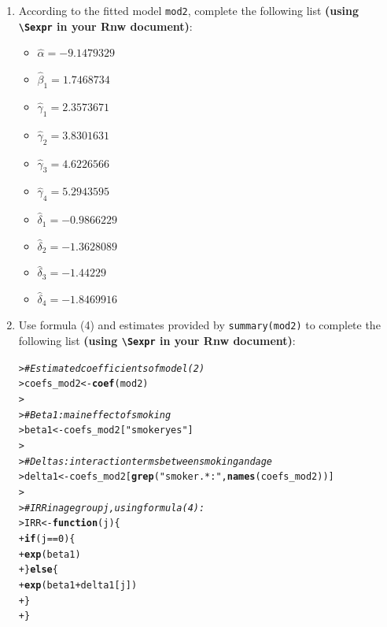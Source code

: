 \documentclass[a4paper,10pt]{article}\usepackage[]{graphicx}\usepackage[]{xcolor}
\makeatletter
\newcommand{\hlnum}[1]{\textcolor[rgb]{0.686,0.059,0.569}{#1}}%
\newcommand{\hlsng}[1]{\textcolor[rgb]{0.192,0.494,0.8}{#1}}%
\newcommand{\hlcom}[1]{\textcolor[rgb]{0.678,0.584,0.686}{\textit{#1}}}%
\newcommand{\hlopt}[1]{\textcolor[rgb]{0,0,0}{#1}}%
\newcommand{\hldef}[1]{\textcolor[rgb]{0.345,0.345,0.345}{#1}}%
\newcommand{\hlkwa}[1]{\textcolor[rgb]{0.161,0.373,0.58}{\textbf{#1}}}%
\newcommand{\hlkwb}[1]{\textcolor[rgb]{0.69,0.353,0.396}{#1}}%
\newcommand{\hlkwc}[1]{\textcolor[rgb]{0.333,0.667,0.333}{#1}}%
\newcommand{\hlkwd}[1]{\textcolor[rgb]{0.737,0.353,0.396}{\textbf{#1}}}%
\newenvironment{kframe}{%
 \def\at@end@of@kframe{}%
 \ifinner\ifhmode%
  \def\at@end@of@kframe{\end{minipage}}%
  \begin{minipage}{\columnwidth}%
 \fi\fi%
 \def\FrameCommand##1{\hskip\@totalleftmargin \hskip-\fboxsep
 \colorbox{shadecolor}{##1}\hskip-\fboxsep
     \hskip-\linewidth \hskip-\@totalleftmargin \hskip\columnwidth}%
 \MakeFramed {\advance\hsize-\width
   \@totalleftmargin\z@ \linewidth\hsize
   \@setminipage}}%
 {\par\unskip\endMakeFramed%
 \at@end@of@kframe}
\newenvironment{knitrout}{}{} %
\makeatother
\begin{document}
\begin{enumerate}
According to the p-value $=0.0164<0.05$, we reject the null hypothesis. Accordingly, from now on, we discard model (\ref{eq:modelmain}) and \textbf{continue the exercise using model} (\ref{eq:modelinter}) \textbf{(i.e., the fitted model \texttt{mod2})}. As a consequence, we are assuming that age is an effect modifier.

  \item According to the fitted model \texttt{mod2}, complete the following list \textbf{(using \texttt{\textbackslash Sexpr} in your Rnw document)}:
    \begin{itemize}
        \item $\hat{\alpha} = -9.1479329$ 
        \item $\hat{\beta}_{1} = 1.7468734$  
        \item $\hat{\gamma}_{1} = 2.3573671$  
        \item $\hat{\gamma}_{2} = 3.8301631$   
        \item $\hat{\gamma}_{3} = 4.6226566$  
        \item $\hat{\gamma}_{4} = 5.2943595$  
        \item $\hat{\delta}_{1} = -0.9866229$  
        \item $\hat{\delta}_{2} = -1.3628089$ 
        \item $\hat{\delta}_{3} = -1.44229$ 
        \item $\hat{\delta}_{4} = -1.8469916$ 
    \end{itemize}


  \item Use formula (4) and estimates provided by \texttt{summary(mod2)} to complete the following list \textbf{(using \texttt{\textbackslash Sexpr} in your Rnw document)}:
  
    
\begin{knitrout}\footnotesize
{}\color{fgcolor}\begin{kframe}
\begin{alltt}
\hldef{> }\hlcom{# Estimated coefficients of model (2)}
\hldef{> }\hldef{coefs_mod2} \hlkwb{<-} \hlkwd{coef}\hldef{(mod2)}
\hldef{> }
\hldef{> }\hlcom{# Beta1: main effect of smoking}
\hldef{> }\hldef{beta1} \hlkwb{<-} \hldef{coefs_mod2[}\hlsng{"smokeryes"}\hldef{]}
\hldef{> }
\hldef{> }\hlcom{# Deltas: interaction terms between smoking and age}
\hldef{> }\hldef{delta1} \hlkwb{<-} \hldef{coefs_mod2[}\hlkwd{grep}\hldef{(}\hlsng{"smoker.*:"}\hldef{,} \hlkwd{names}\hldef{(coefs_mod2))]}
\hldef{> }
\hldef{> }\hlcom{# IRR in age group j, using formula (4):}
\hldef{> }\hldef{IRR} \hlkwb{<-} \hlkwa{function}\hldef{(}\hlkwc{j}\hldef{)\{}
\hldef{+ }  \hlkwa{if} \hldef{(j}\hlopt{==}\hlnum{0}\hldef{) \{}
\hldef{+ }    \hlkwd{exp}\hldef{(beta1)}
\hldef{+ }  \hldef{\}} \hlkwa{else} \hldef{\{}
\hldef{+ }    \hlkwd{exp}\hldef{(beta1} \hlopt{+} \hldef{delta1[j])}
\hldef{+ }  \hldef{\}}
\hldef{+ }\hldef{\}}
\end{alltt}
\end{kframe}
\end{knitrout}


\end{enumerate}
\end{document}
